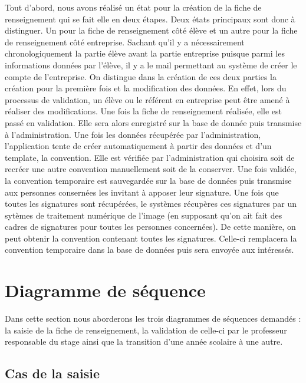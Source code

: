 \documentclass{scrreprt}
\begin{document}
	Tout d'abord, nous avons réalisé un état pour la création de la fiche de renseignement qui se fait elle en deux 
étapes. Deux états principaux sont donc à distinguer. Un pour la fiche de renseignement côté élève et un autre pour 
la fiche de renseignement côté entreprise. Sachant qu'il y a nécessairement chronologiquement la partie élève avant 
la partie entreprise puisque parmi les informations données par l'élève, il y a le mail permettant au système de 
créer le compte de l'entreprise. On distingue dans la création de ces deux parties la création pour la première fois et 
la modification des données. En effet, lors du processus de validation, un élève ou le référent en entreprise peut être 
amené à réaliser des modifications. 
	Une fois la fiche de renseignement réalisée, elle est passé en validation. Elle sera alors enregistré sur la base
de donnée puis transmise à l'administration. 
	Une fois les données récupérée par l'administration, l'application tente de créer automatiquement à partir des données
et d'un template, la convention. Elle est vérifiée par l'administration qui choisira soit de recréer une autre convention manuellement
soit de la conserver. 
	Une fois validée, la convention temporaire est sauvegardée sur la base de données puis transmise aux personnes consernées les invitant
à apposer leur signature. 
	Une fois que toutes les signatures sont récupérées, le systèmes récupères ces signatures par un sytèmes de traitement numérique de l'image 
(en supposant qu'on ait fait des cadres de signatures pour toutes les personnes concernées). De cette manière, on peut obtenir la convention contenant
toutes les signatures. Celle-ci remplacera la convention temporaire dans la base de données puis sera envoyée aux intéressés.  


\newpage
\chapter{Diagramme de séquence}

	Dans cette section nous aborderons les trois diagrammes de séquences demandés : la saisie de la fiche de renseignement,
la validation de celle-ci par le professeur responsable du stage ainsi que la transition d'une année scolaire à une autre.

\newpage
\section{Cas de la saisie}
\end{document}
